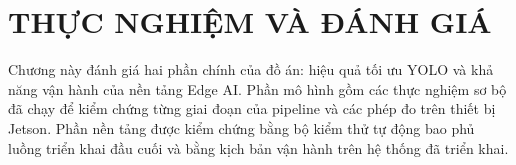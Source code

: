 \chapter{THỰC NGHIỆM VÀ ĐÁNH GIÁ}

Chương này đánh giá hai phần chính của đồ án: hiệu quả tối ưu YOLO và khả năng
vận hành của nền tảng Edge AI. Phần mô hình gồm các thực nghiệm sơ bộ đã chạy để
kiểm chứng từng giai đoạn của pipeline và các phép đo trên thiết bị Jetson. Phần
nền tảng được kiểm chứng bằng bộ kiểm thử tự động bao phủ luồng triển khai đầu
cuối và bằng kịch bản vận hành trên hệ thống đã triển khai.










